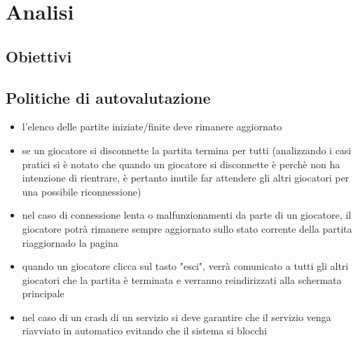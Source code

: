 \chapter{Analisi}
\label{ch:analisi} %
\section{Obiettivi}
\section{Politiche di autovalutazione} 
\begin{itemize}
    \item l'elenco delle partite iniziate/finite deve rimanere aggiornato
    \item se un giocatore si disconnette la partita termina per tutti (analizzando i casi pratici si è notato che quando un giocatore si disconnette è perchè non ha intenzione di rientrare, è pertanto inutile far attendere gli altri giocatori per una possibile riconnessione)
    \item nel caso di connessione lenta o malfunzionamenti da parte di un giocatore, il giocatore potrà rimanere sempre aggiornato sullo stato corrente della partita riaggiornado la pagina
    \item quando un giocatore clicca sul tasto "esci", verrà comunicato a tutti gli altri giocatori che la partita è terminata e verranno reindirizzati alla schermata principale
    \item nel caso di un crash di un servizio si deve garantire che il servizio venga riavviato in automatico evitando che il sistema si blocchi
\end{itemize}

